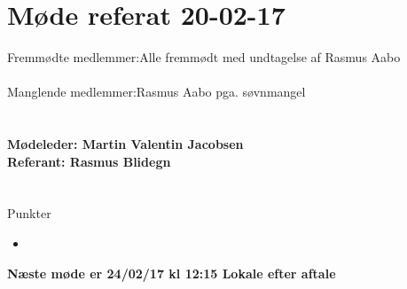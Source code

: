 \documentclass[12pt]{article}
\begin{document}
\section*{Møde referat 20-02-17}

Fremmødte medlemmer:Alle fremmødt med undtagelse af Rasmus Aabo\\\\
Manglende medlemmer:Rasmus Aabo pga. søvnmangel\\\\ 
\\\textbf{Mødeleder: Martin Valentin Jacobsen}
\\\textbf{Referant: Rasmus Blidegn}
\\\\\\
Punkter
\begin{itemize}
\item 
\end{itemize}

\large{\textbf{Næste møde er 24/02/17 kl 12:15 Lokale efter aftale }}
\end{document}
